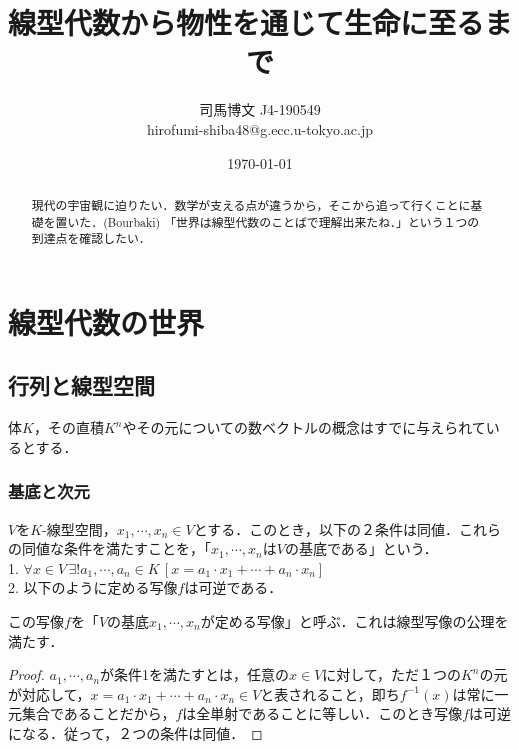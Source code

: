 \documentclass[uplatex, dvipdfmx]{jsreport}
\title{線型代数から物性を通じて生命に至るまで}
\author{司馬博文 J4-190549\\hirofumi-shiba48@g.ecc.u-tokyo.ac.jp}
\date{\today}
\begin{document}
\maketitle
\begin{abstract}
    現代の宇宙観に迫りたい．数学が支える点が違うから，そこから追って行くことに基礎を置いた．(Bourbaki)
    「世界は線型代数のことばで理解出来たね．」という１つの到達点を確認したい．
\end{abstract}
\tableofcontents

\part{線型代数の世界}
\chapter{行列と線型空間}

体$K$，その直積$K^n$やその元についての数ベクトルの概念はすでに与えられているとする．

\section{基底と次元}

\begin{shadebox}\begin{definition}[基底]\rm{}
    $V$を$K$-線型空間，$x_1,\cdots,x_n\in V$とする．このとき，以下の２条件は同値．これらの同値な条件を満たすことを，「$x_1,\cdots,x_n$は$V$の基底である」という．\\
    1. $\forall x\in V \, \exists ! a_1,\cdots, a_n\in K \, [x=a_1\cdot x_1 +\cdots +a_n\cdot x_n]$\\
    2. 以下のように定める写像$f$は可逆である．
    \begin{center}\end{center}
    この写像$f$を「$V$の基底$x_1,\cdots,x_n$が定める写像」と呼ぶ．これは線型写像の公理を満たす．
\end{definition}\end{shadebox}

\begin{proof}
$a_1,\cdots,a_n$が条件1を満たすとは，任意の$x\in V$に対して，ただ１つの$K^n$の元が対応して，$x=a_1\cdot x_1 +\cdots +a_n\cdot x_n \in V$と表されること，即ち$f^{-1}(x)$は常に一元集合であることだから，$f$は全単射であることに等しい．このとき写像$f$は可逆になる．従って，２つの条件は同値．
\end{proof}
\end{document}
